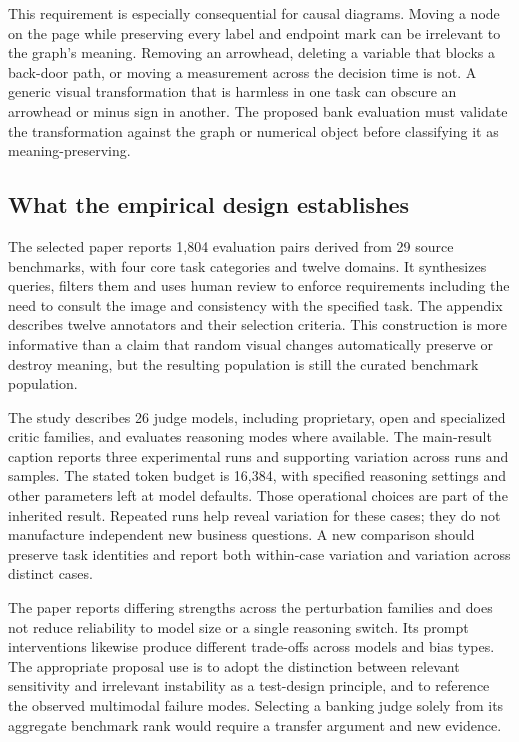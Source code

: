 This requirement is especially consequential for causal diagrams. Moving a
node on the page while preserving every label and endpoint mark can be
irrelevant to the graph's meaning. Removing an arrowhead, deleting a variable
that blocks a back-door path, or moving a measurement across the decision
time is not. A generic visual transformation that is harmless in one task
can obscure an arrowhead or minus sign in another. The proposed bank
evaluation must validate the transformation against the graph or numerical
object before classifying it as meaning-preserving.
\citep{exec24_judgebias_reference}

\subsection{What the empirical design establishes}

The selected paper reports 1,804 evaluation pairs derived from 29 source
benchmarks, with four core task categories and twelve domains. It synthesizes
queries, filters them and uses human review to enforce requirements including
the need to consult the image and consistency with the specified task.
The appendix describes twelve annotators and their selection criteria. This
construction is more informative than a claim that random visual changes
automatically preserve or destroy meaning, but the resulting population is
still the curated benchmark population.~\citep{exec24_judgebias_original}

The study describes 26 judge models, including proprietary, open and
specialized critic families, and evaluates reasoning modes where available.
The main-result caption reports three experimental runs and supporting
variation across runs and samples. The stated token budget is 16,384, with
specified reasoning settings and other parameters left at model defaults.
Those operational choices are part of the inherited result. Repeated runs
help reveal variation for these cases; they do not manufacture independent
new business questions. A new comparison should preserve task identities
and report both within-case variation and variation across distinct cases.
\citep{exec24_judgebias_original,exec24_judgebias_reference}

The paper reports differing strengths across the perturbation families and
does not reduce reliability to model size or a single reasoning switch.
Its prompt interventions likewise produce different trade-offs across
models and bias types. The appropriate proposal use is to adopt the
distinction between relevant sensitivity and irrelevant instability as a
test-design principle, and to reference the observed multimodal failure
modes. Selecting a banking judge solely from its aggregate benchmark rank
would require a transfer argument and new evidence.
\citep{exec24_judgebias_original,exec24_judgebias_reference}

